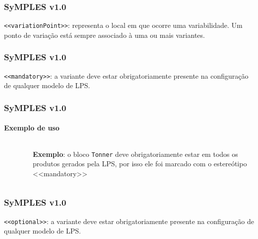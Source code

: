 \begin{frame}
\frametitle{SyMPLES v1.0}

  \texttt{<<variationPoint>>}: representa o local em que ocorre uma variabilidade. Um ponto de variação está sempre associado à uma ou mais variantes.

\end{frame}


\begin{frame}
\frametitle{SyMPLES v1.0}

  \texttt{<<mandatory>>}: a variante deve estar obrigatoriamente presente na configuração de qualquer modelo de LPS.

\end{frame}


\begin{frame}
\frametitle{SyMPLES v1.0}
\framesubtitle{Exemplo de uso}

  \begin{columns}[onlytextwidth]
  
    \begin{column}{0.5\textwidth}
      \begin{figure}
      \end{figure}
    \end{column}
    
    \begin{column}{0.5\textwidth}
      \textbf{Exemplo}: o bloco \texttt{Tonner} deve obrigatoriamente estar em todos os produtos gerados pela LPS, por isso ele foi marcado com o estereótipo <<mandatory>>
    \end{column}
    
  \end{columns}

\end{frame}


\begin{frame}
\frametitle{SyMPLES v1.0}

  \texttt{<<optional>>}: a variante deve estar obrigatoriamente presente na configuração de qualquer modelo de LPS.

\end{frame}


